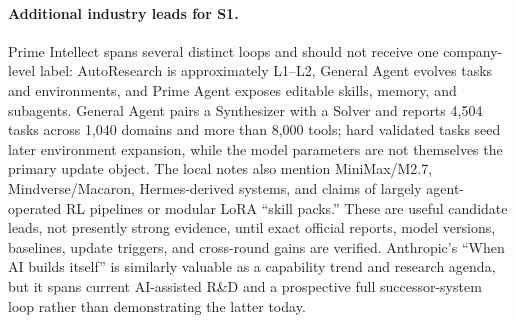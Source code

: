 \paragraph{Additional industry leads for S1.}
Prime Intellect spans several distinct loops and should not receive one company-level
label: AutoResearch is approximately L1--L2, General Agent evolves tasks
and environments, and Prime Agent exposes editable skills, memory, and
subagents. General Agent pairs a Synthesizer with a Solver and reports 4,504
tasks across 1,040 domains and more than 8,000 tools; hard validated tasks seed
later environment expansion, while the model parameters are not themselves the
primary update object. The local notes also mention MiniMax/M2.7, Mindverse/Macaron,
Hermes-derived systems, and claims of largely agent-operated RL pipelines or
modular LoRA ``skill packs.'' These are useful candidate leads, not presently
strong evidence, until exact official reports, model versions, baselines,
update triggers, and cross-round gains are verified. Anthropic's ``When AI
builds itself'' is similarly valuable as a capability trend and research agenda,
but it spans current AI-assisted R\&D and a prospective full successor-system
loop rather than demonstrating the latter today.




\fi
